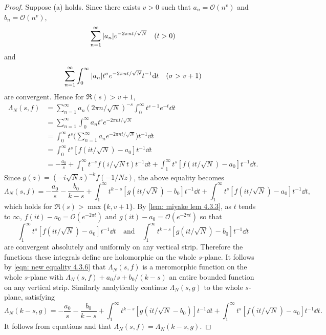 \documentclass[10pt,leqno,twoside]{article}
\theoremstyle{plain}
\theoremstyle{definition}
\numberwithin{equation}{section}
\numberwithin{lem}{section}
\begin{document}
\begin{proof}
    Suppose (a) holds. Since there exists $v>0$ such that $a_n = \mathcal O(n^v)$ and $b_n = \mathcal O(n^v)$, 
    \[\sum_{n=1}^\infty \abs{a_n}e^{-2\pi n t/\sqrt{N}}\quad (t>0)\] and 
    \[\sum_{n=1}^\infty \int_0^\infty \abs{a_n}t^\sigma e^{-2\pi n t/\sqrt{N}}t^{-1}\dd t \quad (\sigma > v+1)\] are convergent. Hence for $\Re(s)>v+1$, 
    \begin{align*}
        \varLambda_N(s,f) &= \sum_{n=1}^\infty a_n(2\pi n/\sqrt{N})^{-s}\int_0^\infty t^{s-1}e^{-t}\dd t\\
        &= \sum_{n=1}^\infty \int_0^\infty a_nt^s e^{-2\pi n t/\sqrt{N}}\\
        &= \int_0^\infty t^s\bigg(\sum_{n=1}^\infty a_n e^{-2\pi nt /\sqrt{N}}\bigg)t^{-1}\dd t\\
        &= \int_0^\infty t^s[f(it/\sqrt{N}) - a_0]t^{-1}\dd t\\
        &= -\frac{a_0}{s} + \int_1^\infty t^{-s}f(i/\sqrt{N}t)t^{-1}\dd t + \int_1^\infty t^s[f(it/\sqrt{N}) - a_0]t^{-1}\dd t.
    \end{align*}
    Since $g(z) = (-i\sqrt{N}z)^{-k}f(-1/Nz)$, the above equality becomes 
    \begin{equation}\label{eqn: new equality 4.3.6}
        \varLambda_N(s,f) = -\frac{a_0}{s} - \frac{b_0}{k-s} + \int_1^\infty t^{k-s}[g(it/\sqrt{N})-b_0]t^{-1}\dd t + \int_1^\infty t^s[f(it/\sqrt{N}) - a_0]t^{-1}\dd t,
    \end{equation} which holds for $\Re(s)>\max\{k,v+1\}$. By \cref{lem: miyake lem 4.3.3}, as $t$ tends to $\infty$, $f(it)-a_0 = \mathcal O(e^{-2\pi t})$ and $g(it)-a_0 = \mathcal O(e^{-2\pi t})$ so that 
    \[\int_1^\infty t^s[f(it/\sqrt{N}) - a_0]t^{-1}\dd t\quad\text{and}\quad \int_1^\infty t^{k-s}[g(it/\sqrt{N})-b_0]t^{-1}\dd t\] are convergent absolutely and uniformly on any vertical strip. Therefore the functions these integrals define are holomorphic on the whole $s$-plane. It follows by \cref{eqn: new equality 4.3.6} that $\varLambda_N(s,f)$ is a meromorphic function on the whole $s$-plane with $\varLambda_N(s,f) + a_0/s+b_0/(k-s)$ an entire bounded function on any vertical strip. Similarly analytically continue $\varLambda_N(s,g)$ to the whole $s$-plane, satisfying 
    \begin{equation}\label{eqn: similar for g 4.3.6}
        \varLambda_N(k-s,g) = -\frac{a_0}{s}-\frac{b_0}{k-s} + \int_1^\infty t^{k-s}[g(it/\sqrt{N}-b_0)]t^{-1}\dd t + \int_1^\infty t^s[f(it/\sqrt{N})-a_0]t^{-1}\dd t.
    \end{equation}
    It follows from equations  and  that $\varLambda_N(s,f) = \varLambda_N(k-s,g)$.


\end{proof}
\end{document}
